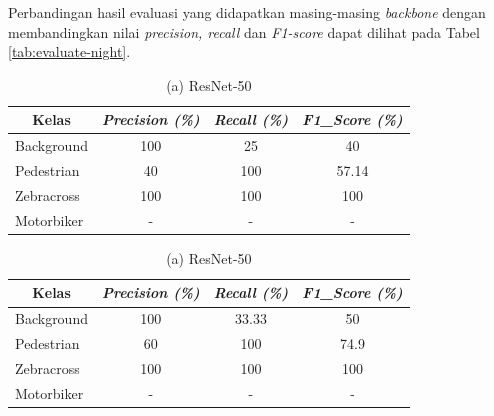 Perbandingan hasil evaluasi yang didapatkan masing-masing \textit{backbone} dengan membandingkan nilai \textit{precision, recall} dan \textit{F1-score} dapat dilihat pada Tabel \ref{tab:evaluate-night}.

\begin{table}[!h]
	\centering
	\begin{minipage}[b]{\textwidth}
		\centering
		\begin{tabular}{|l|c|c|c|}
			\hline
			\multicolumn{1}{|c|}{\textbf{Kelas}} & \textit{\textbf{Precision (\%)}} & \textit{\textbf{Recall (\%)}} & \textit{\textbf{F1\_Score (\%)}} \\ \hline
			Background                           & 100                              & 25                            & 40                               \\ \hline
			Pedestrian                           & 40                               & 100                           & 57.14                            \\ \hline
			Zebracross                           & 100                              & 100                           & 100                              \\ \hline
			Motorbiker                           & -                                & -                             & -                                \\ \hline
		\end{tabular}	
		\caption*{(a) ResNet-50}
	\end{minipage}
	\vfill
	\begin{minipage}[b]{\textwidth}
		\centering
		\begin{tabular}{|l|c|c|c|}
			\hline
			\multicolumn{1}{|c|}{\textbf{Kelas}} & \textit{\textbf{Precision (\%)}} & \textit{\textbf{Recall (\%)}} & \textit{\textbf{F1\_Score (\%)}} \\ \hline
			Background                           & 100                              & 33.33                         & 50                               \\ \hline
			Pedestrian                           & 60                               & 100                           & 74.9                             \\ \hline
			Zebracross                           & 100                              & 100                           & 100                              \\ \hline
			Motorbiker                           & -                                & -                             & -                                \\ \hline

\end{tabular}
\end{minipage}
\end{table}
